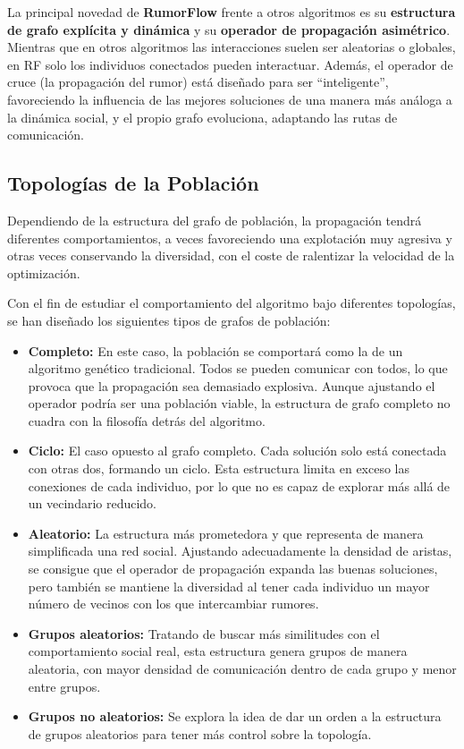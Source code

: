 \documentclass[11pt,a4paper]{article}
\begin{document}
\vspace{0.5cm}

La principal novedad de \textbf{RumorFlow} frente a otros algoritmos es su 
\textbf{estructura de grafo explícita y dinámica} y su \textbf{operador de propagación asimétrico}. 
Mientras que en otros algoritmos las interacciones suelen ser aleatorias o 
globales, en RF solo los individuos conectados pueden interactuar. Además, 
el operador de cruce (la propagación del rumor) está diseñado para ser 
``inteligente'', favoreciendo la influencia de las mejores soluciones 
de una manera más análoga a la dinámica social, y el propio grafo evoluciona, 
adaptando las rutas de comunicación.

\subsection{Topologías de la Población}

Dependiendo de la estructura del grafo de población,
la propagación tendrá diferentes comportamientos, a veces favoreciendo una explotación muy 
agresiva y otras veces conservando la diversidad, con el coste de ralentizar la velocidad de 
la optimización.

Con el fin de estudiar el comportamiento del algoritmo bajo diferentes topologías, se han 
diseñado los siguientes tipos de grafos de población:

\begin{itemize}
    \item \textbf{Completo:} En este caso, la población se comportará como la de un algoritmo genético tradicional.
    Todos se pueden comunicar con todos, lo que provoca que la propagación sea demasiado explosiva. Aunque ajustando 
    el operador podría ser una población viable, la estructura de grafo completo no cuadra con la filosofía detrás 
    del algoritmo.
    \item \textbf{Ciclo:} El caso opuesto al grafo completo. Cada solución solo está conectada con otras dos, formando 
    un ciclo. Esta estructura limita en exceso las conexiones de cada individuo, por lo que no es capaz de explorar 
    más allá de un vecindario reducido. 
    \item \textbf{Aleatorio:} La estructura más prometedora y que representa de manera simplificada una red social.
    Ajustando adecuadamente la densidad de aristas, se consigue que el operador de propagación expanda las buenas 
    soluciones, pero también se mantiene la diversidad al tener cada individuo un mayor número de vecinos con los que intercambiar rumores.
    \item \textbf{Grupos aleatorios:} Tratando de buscar más similitudes con el comportamiento social real, esta 
    estructura genera grupos de manera aleatoria, con mayor densidad de comunicación dentro de cada grupo y menor entre grupos.
    \item \textbf{Grupos no aleatorios:} Se explora la idea de dar un orden a la estructura de grupos aleatorios para 
    tener más control sobre la topología.
\end{itemize}
\end{document}
